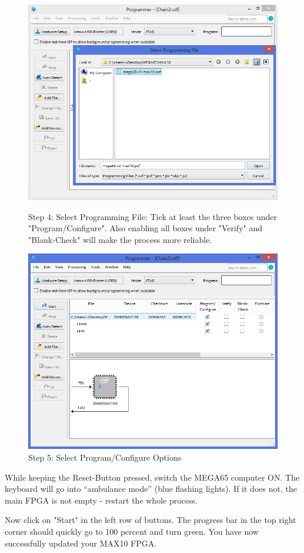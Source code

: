 \begin{figure}[H]
  \centering
  \includegraphics[width=0.7\linewidth]{images/max10_04.png}
  \captionsetup{width=0.7\linewidth}
  \caption{Step 4: Select Programming File:
           Tick at least the three boxes under "Program/Configure".
           Also enabling all boxes under "Verify" and "Blank-Check"
           will make the process more reliable.}
  \label{fig:max10_04}

\vspace{5mm}

  \includegraphics[width=0.7\linewidth]{images/max10_05.png}
  \captionsetup{width=0.7\linewidth}
  \caption{Step 5: Select Program/Configure Options}
  \label{fig:max10_05}
\end{figure}

While keeping the Reset-Button pressed, switch the MEGA65 computer ON.
The keyboard will go into ``ambulance mode'' (blue flashing lights).
If it does not, the main FPGA is not empty - restart the whole process.

Now click on "Start" in the left row of buttons. The progress bar in
the top right corner should quickly go to 100 percent and turn green.
You have now successfully updated your MAX10 FPGA.


